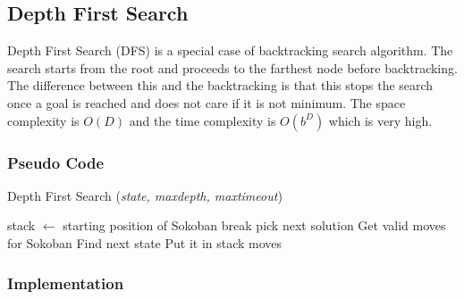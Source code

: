 \subsection{Depth First Search}
\noindent Depth First Search (DFS) is a special case of backtracking search algorithm. The search starts from the root and proceeds to the farthest node before backtracking. The difference between this and the backtracking is that this stops the search once a goal is reached and does not care if it is not minimum. The space complexity is $O(D)$ and the time complexity is $O(b^D)$ which is very high.

\subsubsection{Pseudo Code}
\begin{algorithm}[H]
	\caption{Depth First Search (\textit{state, maxdepth, maxtimeout})}
	\label{alg:dfs}
	\begin{algorithmic}[1]
	\State stack $\gets$ starting position of Sokoban
			\State break
		\Else
				\State pick next solution
			\Else
				\State Get valid moves for Sokoban
					\State Find next state
					\State Put it in stack
				\EndFor
			\EndIf
		\EndIf
	\EndWhile
	\State \Return moves
	\end{algorithmic}
\end{algorithm}

\subsubsection{Implementation}